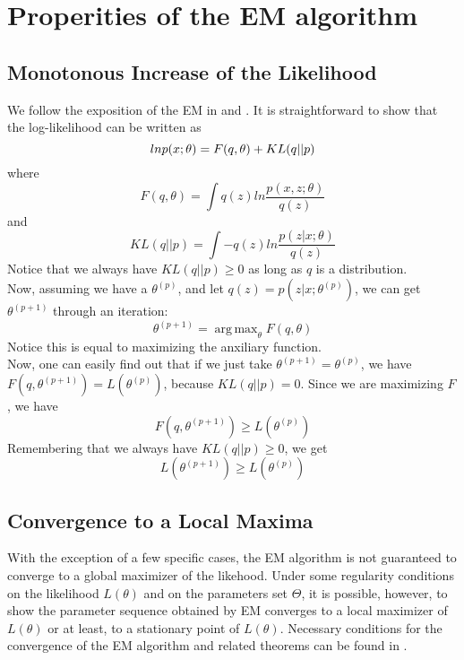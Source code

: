 \documentclass[11pt]{article}
\DeclareMathOperator*{\argmax}{arg\,max}
\begin{document}
\section{Properities of the EM algorithm}
\subsection{Monotonous Increase of the Likelihood}
We follow the exposition of the EM in \cite{PRML} and \cite{1998RM}. It is straightforward to show that the log-likelihood can be written as
\begin{equation}{\label{4}}
lnp(x;\theta)=F(q,\theta) + KL(q||p)
\end{equation}
where
\begin{equation}
F(q,\theta)=\int q(z)ln\frac{p(x,z;\theta)}{q(z)}
\end{equation}
and
\begin{equation}
KL(q||p)=\int -q(z)ln\frac{p(z|x;\theta)}{q(z)}
\end{equation}
Notice that we always have $KL(q||p) \geq 0$ as long as $q$ is a distribution.\\
Now, assuming we have a $\theta^{(p)}$, and let $q(z) = p(z|x;\theta^{(p)})$, we can get $\theta^{(p+1)}$ through an iteration:
\begin{equation}
\theta^{(p+1)} = \argmax_{\theta}F(q, \theta)
\end{equation}
Notice this is equal to maximizing the anxiliary function.\\
Now, one can easily find out that if we just take $\theta^{(p+1)}=\theta^{(p)}$, we have$F(q, \theta^{(p+1)}) = L(\theta^{(p)})$, because $KL(q||p)=0$. Since we are maximizing $F$, we have
\begin{equation}
F(q, \theta^{(p+1)}) \geq L(\theta^{(p)})
\end{equation}
Remembering that we always have $KL(q||p) \geq 0$, we get
\begin{equation}
L(\theta^{(p+1)}) \geq L(\theta^{(p)})
\end{equation}
\subsection{Convergence to a Local Maxima}
With the exception of a few specific cases, the EM algorithm is not guaranteed to converge to a global maximizer of the likehood\cite{EMTour}. Under some regularity conditions on the likelihood $L(\theta)$ and on the parameters set $\Theta$, it is possible, however, to show the parameter sequence obtained by EM converges to a local maximizer of $L(\theta)$ or at least, to a stationary point of $L(\theta)$. Necessary conditions for the convergence of the EM algorithm and related theorems can be found in \cite{EMCov}.
\end{document}
